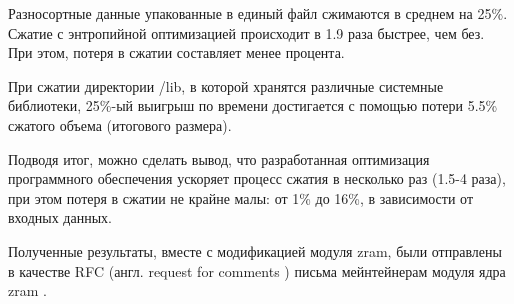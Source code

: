 Разносортные данные упакованные в единый файл сжимаются в среднем на 25\%. Сжатие с энтропийной оптимизацией происходит в 1.9 раза быстрее, чем без. При этом, потеря в сжатии составляет менее процента.

При сжатии директории /lib, в которой хранятся различные системные библиотеки, 25\%-ый выигрыш по времени достигается с помощью потери 5.5\% сжатого объема (итогового размера).

Подводя итог, можно сделать вывод, что разработанная оптимизация программного обеспечения ускоряет процесс сжатия в несколько раз (1.5-4 раза), при этом потеря в сжатии не крайне малы: от 1\% до 16\%, в зависимости от входных данных. 

Полученные результаты, вместе с модификацией модуля zram, были отправлены в качестве RFC (англ. request for comments \cite{rfc}) письма мейнтейнерам модуля ядра zram \cite{rfc-kernel-patch}.

\pagebreak